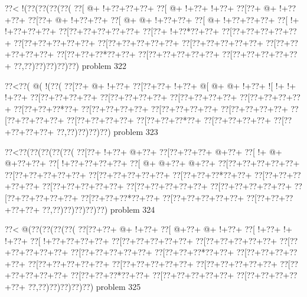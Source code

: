 \vbox{\vbox{\goo
\0??<\- !(\0??(\0??(\0??(\0??(
\0??[\- @+\- !+\0??+\0??+\0??+
\0??[\- @+\- !+\0??+\- !+\0??+
\0??[\0??+\- @+\- !+\0??+\0??+
\0??[\0??+\- @+\- !+\0??+\0??+
\0??[\- @+\- @+\- !+\0??+\0??+
\0??[\- @+\- !+\0??+\0??+\0??+
\0??[\- !+\- !+\0??+\0??+\0??+
\0??[\0??+\0??+\0??+\0??+\0??+
\0??[\0??+\- !+\0??*\0??+\0??+
\0??[\0??+\0??+\0??+\0??+\0??+
\0??[\0??+\0??+\0??+\0??+\0??+
\0??[\0??+\0??+\0??+\0??+\0??+
\0??[\0??+\0??+\0??+\0??+\0??+
\0??[\0??+\0??+\0??+\0??+\0??+
\0??[\0??+\0??+\0??*\0??+\0??+
\0??[\0??+\0??+\0??+\0??+\0??+
\0??[\0??+\0??+\0??+\0??+\0??+
\0??,\0??)\0??)\0??)\0??)\0??)
}
\hfil problem 322\hfil\break
}

\vbox{\vbox{\goo
\0??<\0??(\- @(\- !(\0??(
\0??[\0??+\- @+\- !+\0??+
\0??[\0??+\0??+\- !+\0??+
\- @[\- @+\- @+\- !+\0??+
\- ![\- !+\- !+\- !+\0??+
\0??[\0??+\0??+\0??+\0??+
\0??[\0??+\0??+\0??+\0??+
\0??[\0??+\0??+\0??+\0??+
\0??[\0??+\0??+\0??+\0??+
\0??[\0??+\0??+\0??*\0??+
\0??[\0??+\0??+\0??+\0??+
\0??[\0??+\0??+\0??+\0??+
\0??[\0??+\0??+\0??+\0??+
\0??[\0??+\0??+\0??+\0??+
\0??[\0??+\0??+\0??+\0??+
\0??[\0??+\0??+\0??*\0??+
\0??[\0??+\0??+\0??+\0??+
\0??[\0??+\0??+\0??+\0??+
\0??,\0??)\0??)\0??)\0??)
}
\hfil problem 323\hfil\break
}

\vbox{\vbox{\goo
\0??<\0??(\0??(\0??(\0??(\0??(
\0??[\0??+\- !+\0??+\- @+\0??+
\0??[\0??+\0??+\0??+\- @+\0??+
\0??[\- !+\- @+\- @+\0??+\0??+
\0??[\- !+\0??+\0??+\0??+\0??+
\0??[\- @+\- @+\0??+\- @+\0??+
\0??[\0??+\0??+\0??+\0??+\0??+
\0??[\0??+\0??+\0??+\0??+\0??+
\0??[\0??+\0??+\0??+\0??+\0??+
\0??[\0??+\0??+\0??*\0??+\0??+
\0??[\0??+\0??+\0??+\0??+\0??+
\0??[\0??+\0??+\0??+\0??+\0??+
\0??[\0??+\0??+\0??+\0??+\0??+
\0??[\0??+\0??+\0??+\0??+\0??+
\0??[\0??+\0??+\0??+\0??+\0??+
\0??[\0??+\0??+\0??*\0??+\0??+
\0??[\0??+\0??+\0??+\0??+\0??+
\0??[\0??+\0??+\0??+\0??+\0??+
\0??,\0??)\0??)\0??)\0??)\0??)
}
\hfil problem 324\hfil\break
}

\vbox{\vbox{\goo
\0??<\- @(\0??(\0??(\0??(\0??(
\0??[\0??+\0??+\- @+\- !+\0??+
\0??[\- @+\0??+\- @+\- !+\0??+
\0??[\- !+\0??+\- !+\- !+\0??+
\0??[\- !+\0??+\0??+\0??+\0??+
\0??[\0??+\0??+\0??+\0??+\0??+
\0??[\0??+\0??+\0??+\0??+\0??+
\0??[\0??+\0??+\0??+\0??+\0??+
\0??[\0??+\0??+\0??+\0??+\0??+
\0??[\0??+\0??+\0??*\0??+\0??+
\0??[\0??+\0??+\0??+\0??+\0??+
\0??[\0??+\0??+\0??+\0??+\0??+
\0??[\0??+\0??+\0??+\0??+\0??+
\0??[\0??+\0??+\0??+\0??+\0??+
\0??[\0??+\0??+\0??+\0??+\0??+
\0??[\0??+\0??+\0??*\0??+\0??+
\0??[\0??+\0??+\0??+\0??+\0??+
\0??[\0??+\0??+\0??+\0??+\0??+
\0??,\0??)\0??)\0??)\0??)\0??)
}
\hfil problem 325\hfil\break
}

